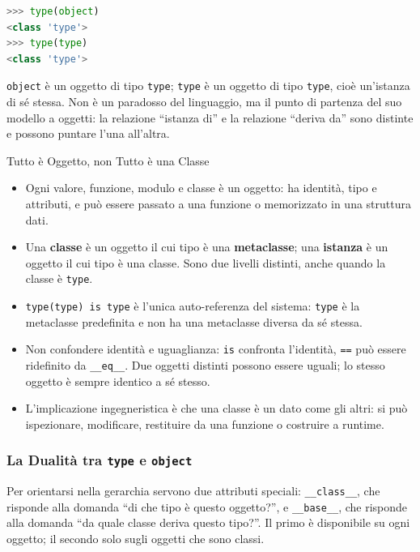 \documentclass[12pt]{extarticle}
\begin{document}
\begin{lstlisting}[language=Python]
>>> type(object)
<class 'type'>
>>> type(type)
<class 'type'>
\end{lstlisting}

\noindent \texttt{object} è un oggetto di tipo \texttt{type}; \texttt{type} è un oggetto di tipo \texttt{type}, cioè un'istanza di sé stessa. Non è un paradosso del linguaggio, ma il punto di partenza del suo modello a oggetti: la relazione ``istanza di'' e la relazione ``deriva da'' sono distinte e possono puntare l'una all'altra.

\begin{cbox}{Tutto è Oggetto, non Tutto è una Classe}
\begin{itemize}
    \item Ogni valore, funzione, modulo e classe è un oggetto: ha identità, tipo e attributi, e può essere passato a una funzione o memorizzato in una struttura dati.
    \item Una \textbf{classe} è un oggetto il cui tipo è una \textbf{metaclasse}; una \textbf{istanza} è un oggetto il cui tipo è una classe. Sono due livelli distinti, anche quando la classe è \texttt{type}.
    \item \texttt{type(type) is type} è l'unica auto-referenza del sistema: \texttt{type} è la metaclasse predefinita e non ha una metaclasse diversa da sé stessa.
    \item Non confondere identità e uguaglianza: \texttt{is} confronta l'identità, \texttt{==} può essere ridefinito da \texttt{\_\_eq\_\_}. Due oggetti distinti possono essere uguali; lo stesso oggetto è sempre identico a sé stesso.
    \item L'implicazione ingegneristica è che una classe è un dato come gli altri: si può ispezionare, modificare, restituire da una funzione o costruire a runtime.
\end{itemize}
\end{cbox}

\subsubsection{La Dualità tra \texttt{type} e \texttt{object}}

\noindent Per orientarsi nella gerarchia servono due attributi speciali: \texttt{\_\_class\_\_}, che risponde alla domanda ``di che tipo è questo oggetto?'', e \texttt{\_\_base\_\_}, che risponde alla domanda ``da quale classe deriva questo tipo?''. Il primo è disponibile su ogni oggetto; il secondo solo sugli oggetti che sono classi.
\end{document}
